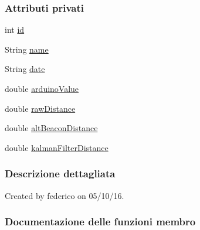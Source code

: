 \subsubsection*{Attributi privati}
\begin{DoxyCompactItemize}
\item 
int \hyperlink{classit_1_1unibo_1_1torsello_1_1bluetoothpositioning_1_1util_1_1Report_a3be425afdc95ab8ce0849c3e26756690_a3be425afdc95ab8ce0849c3e26756690}{id}
\item 
String \hyperlink{classit_1_1unibo_1_1torsello_1_1bluetoothpositioning_1_1util_1_1Report_a0495bf689006bace414e202fd6fc14f2_a0495bf689006bace414e202fd6fc14f2}{name}
\item 
String \hyperlink{classit_1_1unibo_1_1torsello_1_1bluetoothpositioning_1_1util_1_1Report_a949f502cfb2781802504ef43baf64830_a949f502cfb2781802504ef43baf64830}{date}
\item 
double \hyperlink{classit_1_1unibo_1_1torsello_1_1bluetoothpositioning_1_1util_1_1Report_a138fc5e4cf100d8af6d526d1f593609d_a138fc5e4cf100d8af6d526d1f593609d}{arduino\+Value}
\item 
double \hyperlink{classit_1_1unibo_1_1torsello_1_1bluetoothpositioning_1_1util_1_1Report_a93ee0f28ccf1d54becdedff2ad65955f_a93ee0f28ccf1d54becdedff2ad65955f}{raw\+Distance}
\item 
double \hyperlink{classit_1_1unibo_1_1torsello_1_1bluetoothpositioning_1_1util_1_1Report_aad81754844fb8364075ab69052730a98_aad81754844fb8364075ab69052730a98}{alt\+Beacon\+Distance}
\item 
double \hyperlink{classit_1_1unibo_1_1torsello_1_1bluetoothpositioning_1_1util_1_1Report_a35dd29e5e9ffa2bf682746982ee502e9_a35dd29e5e9ffa2bf682746982ee502e9}{kalman\+Filter\+Distance}
\end{DoxyCompactItemize}


\subsubsection{Descrizione dettagliata}
Created by federico on 05/10/16. 

\subsubsection{Documentazione delle funzioni membro}
\hypertarget{classit_1_1unibo_1_1torsello_1_1bluetoothpositioning_1_1util_1_1Report_abccd0d2f01d449bc75cd1f56ab20d051_abccd0d2f01d449bc75cd1f56ab20d051}{}\label{classit_1_1unibo_1_1torsello_1_1bluetoothpositioning_1_1util_1_1Report_abccd0d2f01d449bc75cd1f56ab20d051_abccd0d2f01d449bc75cd1f56ab20d051} 

